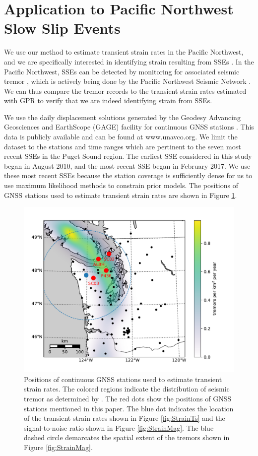 \documentclass[extra,mreferee]{gji}
\begin{document}
\section{Application to Pacific Northwest Slow Slip Events}\label{sec:Cascadia}
We use our method to estimate transient strain rates in the Pacific Northwest, and we are specifically interested in identifying strain resulting from SSEs \citep[e.g.,][]{Dragert2001}. In the Pacific Northwest, SSEs can be detected by monitoring for associated seismic tremor \citep{Rogers2003}, which is actively being done by the Pacific Northwest Seismic Network \citep{Wech2010}. We can thus compare the tremor records to the transient strain rates estimated with GPR to verify that we are indeed identifying strain from SSEs.  

We use the daily displacement solutions generated by the Geodesy Advancing Geosciences and EarthScope (GAGE) facility for continuous GNSS stations \citep{Herring2016}. This data is publicly available and can be found at www.unavco.org. We limit the dataset to the stations and time ranges which are pertinent to the seven most recent SSEs in the Puget Sound region. The earliest SSE considered in this study began in August 2010, and the most recent SSE began in February 2017. We use these most recent SSEs because the station coverage is sufficiently dense for us to use maximum likelihood methods to constrain prior models.  The positions of GNSS stations used to estimate transient strain rates are shown in Figure \ref{fig:Context}.  

\begin{figure}
\includegraphics{figures/context_map/context-map.pdf}
\caption{Positions of continuous GNSS stations used to estimate transient strain rates. The colored regions indicate the distribution of seismic tremor as determined by \citet{Wech2010}. The red dots show the positions of GNSS stations mentioned in this paper. The blue dot indicates the location of the transient strain rates shown in Figure \ref{fig:StrainTs} and the signal-to-noise ratio shown in Figure \ref{fig:StrainMag}. The blue dashed circle demarcates the spatial extent of the tremors shown in Figure \ref{fig:StrainMag}.}    
\label{fig:Context}
\end{figure}
\end{document}
